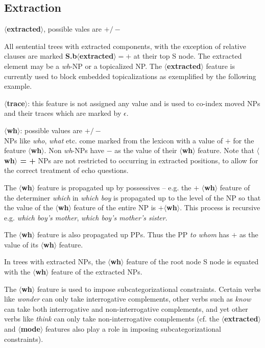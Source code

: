 \subsection{Extraction}
{\bf $\langle$extracted$\rangle$}, possible vales are {\bf $+/-$}

All sentential trees with extracted components, with the exception of
relative clauses are marked {\bf S.b$\langle$extracted$\rangle = +$}
at their top S node. The extracted element may be a {\em wh}-NP or a
topicalized NP. The {\bf $\langle$extracted$\rangle$} feature 
is currently used to block embedded topicalizations as exemplified
by the following example.

\noindent
{\bf $\langle$trace$\rangle$}: this feature is not assigned any value and
is used to co-index moved NPs and their traces which are marked by
$\epsilon$.

\noindent
{\bf $\langle$wh$\rangle$}: possible values are {\bf $+/-$}\\ NPs like
{\em who}, {\em what} etc. come marked from the lexicon with a value
of {\bf $+$} for the feature {\bf $\langle$wh$\rangle$}.  Non {\em
wh}-NPs have {\bf $-$} as the value of their {\bf
$\langle$wh$\rangle$} feature. Note that {\bf $\langle$wh$\rangle$ = +
} NPs are not restricted to occurring in extracted positions, to allow
for the correct treatment of echo questions.

The {\bf $\langle$wh$\rangle$} feature is propagated up by possessives
-- e.g. the $+$ {\bf $\langle$wh$\rangle$} feature of the determiner
{\em which} in {\em which boy} is propagated up to the level of the NP
so that the value of the {\bf $\langle$wh$\rangle$} feature of the
entire NP is $+${\bf $\langle$wh$\rangle$}. This process is recursive
e.g. {\em which boy's mother}, {\em which boy's mother's sister}.

The {\bf $\langle$wh$\rangle$} feature
is also propagated up PPs. Thus the PP {\em to whom} has $+$ as the value of its 
{\bf $\langle$wh$\rangle$} feature. 

In trees with extracted NPs, the {\bf $\langle$wh$\rangle$} feature of the
root node S node is equated with the {\bf $\langle$wh$\rangle$} feature
of the extracted NPs. 

The {\bf $\langle$wh$\rangle$} feature is used to impose
subcategorizational constraints.
Certain verbs like {\em wonder} can
only take interrogative complements, other verbs such as {\em know}
can take both interrogative and non-interrogative complements, and yet
other verbs like {\em think} can only take non-interrogative
complements (cf. the {\bf $\langle$extracted$\rangle$} and {\bf
$\langle$mode$\rangle$} features also play a role in imposing 
subcategorizational constraints).

